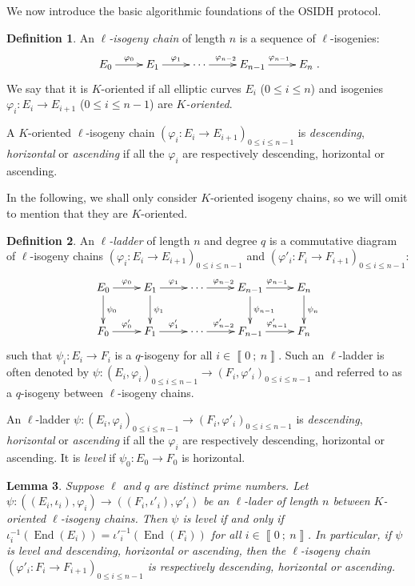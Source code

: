 \documentclass[a4paper,10pt]{report}
\theoremstyle{definition}
\newtheorem{Definition}{Definition}[chapter]
\theoremstyle{plain}
\newtheorem{Lemma}[Definition]{Lemma}
\theoremstyle{definition}
\renewcommand{\i}[2]{\left\llbracket #1~;~#2\right\rrbracket}
\renewcommand{\(}{\left(}
\renewcommand{\)}{\right)}
\DeclareMathOperator{\End}{End}
\begin{document}
We now introduce the basic algorithmic foundations of the OSIDH protocol.

\begin{Definition}
An \emph{$\ell$-isogeny chain} of length $n$ is a sequence of $\ell$-isogenies:
\[\xymatrix{
E_0 \ar[r]^{\varphi_0} & E_1 \ar[r]^{\varphi_{1}}& \cdots \ar[r]^{\varphi_{n-2}} & E_{n-1} \ar[r]^{\varphi_{n-1}} & E_n
}.\]
We say that it is $K$-oriented if all elliptic curves $E_i$ ($0\leq i\leq n$) and isogenies $\varphi_i : E_i\longrightarrow E_{i+1}$ ($0\leq i\leq n-1$) are \emph{$K$-oriented}.

A $K$-oriented $\ell$-isogeny chain $(\varphi_i : E_i\longrightarrow E_{i+1})_{0\leq i\leq n-1}$ is \emph{descending}, \emph{horizontal} or \emph{ascending} if all the $\varphi_i$ are respectively descending, horizontal or ascending.
\end{Definition}

In the following, we shall only consider $K$-oriented isogeny chains, so we will omit to mention that they are $K$-oriented.

\begin{Definition}
An \emph{$\ell$-ladder} of length $n$ and degree $q$ is a commutative diagram of $\ell$-isogeny chains $(\varphi_i:E_i\longrightarrow E_{i+1})_{0\leq i\leq n-1}$ and $(\varphi'_i:F_i\longrightarrow F_{i+1})_{0\leq i\leq n-1}$:
\[\xymatrix{
E_0 \ar[d]^{\psi_0} \ar[r]^{\varphi_0} & E_1\ar[d]^{\psi_1} \ar[r]^{\varphi_{1}}& \cdots \ar[r]^{\varphi_{n-2}} & E_{n-1} \ar[d]^{\psi_{n-1}} \ar[r]^{\varphi_{n-1}} & E_n \ar[d]^{\psi_n}\\
F_0 \ar[r]^{\varphi'_0} & F_1 \ar[r]^{\varphi'_{1}}& \cdots \ar[r]^{\varphi'_{n-2}} & F_{n-1} \ar[r]^{\varphi'_{n-1}} & F_n
}\]
such that $\psi_i : E_i\longrightarrow F_i$ is a $q$-isogeny for all $i\in\i{0}{n}$. Such an $\ell$-ladder is often denoted by $\psi : (E_i,\varphi_i)_{0\leq i\leq n-1}\longrightarrow (F_i,\varphi'_i)_{0\leq i\leq n-1}$ and referred to as a $q$-isogeny between $\ell$-isogeny chains. 

An $\ell$-ladder $\psi : (E_i,\varphi_i)_{0\leq i\leq n-1}\longrightarrow (F_i,\varphi'_i)_{0\leq i\leq n-1}$ is \emph{descending}, \emph{horizontal} or \emph{ascending} if all the $\varphi_i$ are respectively descending, horizontal or ascending.  It is \emph{level} if $\psi_0 : E_0\longrightarrow F_0$ is horizontal.
\end{Definition}

\begin{Lemma}\label{Lemma 2}
Suppose $\ell$ and $q$ are distinct prime numbers. Let $\psi : ((E_i,\iota_i),\varphi_i)\longrightarrow ((F_i,\iota'_i),\varphi'_i)$ be an $\ell$-lader of length $n$ between  $K$-oriented $\ell$-isogeny chains. Then $\psi$ is level if and only if $\iota_i^{-1}(\End(E_i))={\iota'}_i^{-1}(\End(F_i))$ for all $i\in\i{0}{n}$. In particular,  if $\psi$ is level and descending, horizontal or ascending, then the $\ell$-isogeny chain $(\varphi'_i: F_i\longrightarrow F_{i+1})_{0\leq i\leq n-1}$ is respectively descending, horizontal or ascending.
\end{Lemma}
\end{document}
